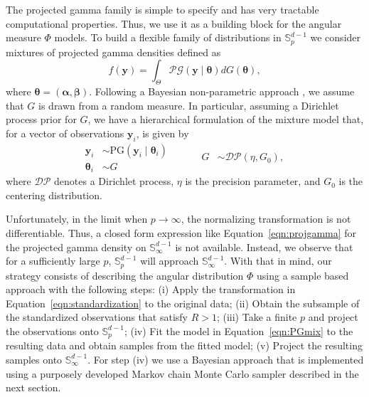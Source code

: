   
The projected gamma family is simple to specify and has very tractable 
  computational properties. Thus, we use it as a building block for the 
  angular measure $\Phi$ models. To build a flexible family of distributions 
  in ${\mathbb S}_p^{d-1}$ we consider mixtures of projected gamma densities 
  defined as
  \begin{equation} \label{eqn:PGmix}     
     f(\bm{y}) = \int_\Theta \mathcal{PG}(\bm{y}\mid \bm{\theta}) dG(\bm{\theta}), 
  \end{equation} 
where $\bm{\theta} = (\bm{\alpha}, \bm{\beta})$. Following a Bayesian 
  non-parametric approach \citep{Ferguson74,Antoniak1974,muller2015},
  we assume that $G$ 
  is drawn from a random measure. In particular, assuming a Dirichlet process 
  prior for $G$, we have a hierarchical formulation of the mixture model that, 
  for a vector of observations $\bm{y}_i$, is given by
  \begin{equation}\label{eqn:dppg}
    \begin{aligned}
    \bm{y}_i &\sim \text{PG}(\bm{y}_i\mid \bm{\theta}_i)\\
    \bm{\theta}_i &\sim G
    \end{aligned}
    ~\hspace{1cm}
    \begin{aligned}
    G &\sim \mathcal{DP}(\eta, G_0),
    \end{aligned}
  \end{equation}
  where $\mathcal{DP}$ denotes a Dirichlet process, $\eta$ is the precision 
  parameter, and $G_0$ is the centering distribution. 
  
Unfortunately, in the limit when $p\rightarrow \infty$, the normalizing 
  transformation is not differentiable. Thus, a closed form expression 
  like Equation~\eqref{eqn:projgamma} for the projected gamma density on ${\mathbb S}_\infty^{d-1}$ is not 
  available. Instead, we observe that for a sufficiently large $p$, $\mathbb{S}_p^{d-1}$ will approach
  $\mathbb{S}_{\infty}^{d-1}$.  With that in mind, our strategy consists of describing the angular
  distribution $\Phi$ using a sample based approach with the following steps: (i) Apply the 
  transformation in Equation~\eqref{eqn:standardization} to the original data; (ii) Obtain the 
  subsample of the standardized observations that satisfy $R>1$; (iii) Take a finite $p$ and 
  project the observations onto ${\mathbb S}_p^{d-1}$; 
  (iv) Fit the model in Equation~\eqref{eqn:PGmix} to the resulting 
  data and obtain samples from the fitted model; 
  (v) Project the resulting samples onto ${\mathbb S}_\infty^{d-1}$.
  For step (iv) we use a Bayesian approach that is implemented using a purposely 
  developed Markov chain Monte Carlo sampler described in the next section.

